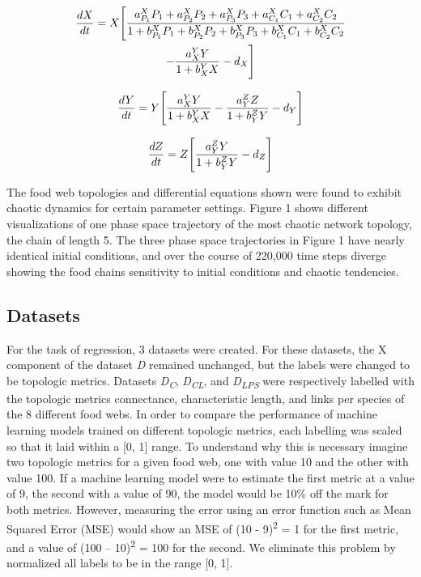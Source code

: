 \documentclass[letterpaper, 10 pt, conference]{ieeeconf}  %
\begin{document}
\begin{multline}
	\frac{dX}{dt} =
   		X\Bigg{[} 
        \frac{{a_{P_1}^{X}P_1 + a_{P_2}^{X}P_2 + a_{P_3}^{X}P_3 + a_{C_1}^{X}C_1 + a_{C_2}^{X}C_2}}{{1 + b_{P_1}^{X}P_1 + b_{P_2}^{X}P_2 + b_{P_3}^{X}P_3 + b_{C_1}^{X}C_1 + b_{C_2}^{X}C_2}} \\ 
        - \frac{a_X^YY}{1 + b_X^YX} - d_X
        \Bigg{]}
\end{multline}

\begin{equation}
	\frac{dY}{dt} =
    Y\Bigg{[}
    	\frac{a_X^YY}{1 + b_X^YX} - \frac{a_Y^ZZ}{1 + b_Y^ZY} - d_Y
    \Bigg{]}
\end{equation}

\begin{equation}
	\frac{dZ}{dt} =
    Z\Bigg{[}
    	\frac{a_Y^ZY}{1 + b_Y^ZY}  - d_Z
    \Bigg{]}
\end{equation}


The food web topologies and differential equations shown were found to exhibit chaotic dynamics for certain parameter settings. Figure 1 shows different visualizations of one phase space trajectory of the most chaotic network topology, the chain of length 5. The three phase space trajectories in Figure 1 have nearly identical initial conditions, and over the course of 220,000 time steps diverge showing the food chains sensitivity to initial conditions and chaotic tendencies.

\subsection{Datasets}
For the task of regression, 3 datasets were created. For these datasets, the X component of the dataset \textit{D} remained unchanged, but the labels were changed to be topologic metrics. Datasets \textit{D\textsubscript{C}},  \textit{D\textsubscript{CL}}, and  \textit{D\textsubscript{LPS}} were respectively labelled with the topologic metrics connectance, characteristic length, and links per species of the 8 different food webs. In order to compare the performance of machine learning models trained on different topologic metrics, each labelling was scaled so that it laid within a [0, 1] range. To understand why this is necessary imagine two topologic metrics for a given food web, one with value 10 and the other with value 100. If a machine learning model were to estimate the first metric at a value of 9, the second with a value of 90, the model would be 10\% off the mark for both metrics. However, measuring the error using an error function such as Mean Squared Error (MSE) would show an MSE of (10 - 9)\textsuperscript{2} = 1 for the first metric, and a value of (100 – 10)\textsuperscript{2} = 100 for the second. We eliminate this problem by normalized all labels to be in the range [0, 1]. 
\end{document}
